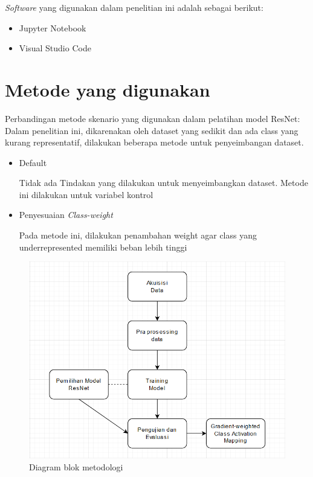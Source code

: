\emph{Software} yang digunakan dalam penelitian ini adalah sebagai berikut:
\begin{itemize}
  \item Jupyter Notebook
  \item Visual Studio Code
\end{itemize}

\section{Metode yang digunakan}

Perbandingan metode skenario yang digunakan dalam pelatihan model ResNet:
Dalam penelitian ini, dikarenakan oleh dataset yang sedikit dan ada class yang kurang representatif, dilakukan beberapa metode untuk penyeimbangan dataset.
\begin{itemize}
  \item Default
  
  Tidak ada Tindakan yang dilakukan untuk menyeimbangkan dataset. Metode ini dilakukan untuk variabel kontrol
  \item Penyesuaian \emph{Class-weight}
  
  Pada metode ini, dilakukan penambahan weight agar class yang underrepresented memiliki beban lebih tinggi
\end{itemize}


\begin{figure} [H] \centering
  \includegraphics[scale=0.5]{gambar/diagramMethod.png}
  \caption{Diagram blok metodologi}
  \label{fig:diagramMethod}
\end{figure}

